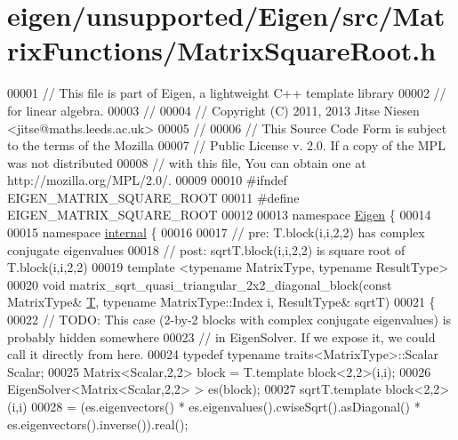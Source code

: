 \hypertarget{eigen_2unsupported_2_eigen_2src_2_matrix_functions_2_matrix_square_root_8h_source}{}\section{eigen/unsupported/\+Eigen/src/\+Matrix\+Functions/\+Matrix\+Square\+Root.h}
\label{eigen_2unsupported_2_eigen_2src_2_matrix_functions_2_matrix_square_root_8h_source}

\begin{DoxyCode}
00001 \textcolor{comment}{// This file is part of Eigen, a lightweight C++ template library}
00002 \textcolor{comment}{// for linear algebra.}
00003 \textcolor{comment}{//}
00004 \textcolor{comment}{// Copyright (C) 2011, 2013 Jitse Niesen <jitse@maths.leeds.ac.uk>}
00005 \textcolor{comment}{//}
00006 \textcolor{comment}{// This Source Code Form is subject to the terms of the Mozilla}
00007 \textcolor{comment}{// Public License v. 2.0. If a copy of the MPL was not distributed}
00008 \textcolor{comment}{// with this file, You can obtain one at http://mozilla.org/MPL/2.0/.}
00009 
00010 \textcolor{preprocessor}{#ifndef EIGEN\_MATRIX\_SQUARE\_ROOT}
00011 \textcolor{preprocessor}{#define EIGEN\_MATRIX\_SQUARE\_ROOT}
00012 
00013 \textcolor{keyword}{namespace }\hyperlink{namespace_eigen}{Eigen} \{ 
00014 
00015 \textcolor{keyword}{namespace }\hyperlink{namespaceinternal}{internal} \{
00016 
00017 \textcolor{comment}{// pre:  T.block(i,i,2,2) has complex conjugate eigenvalues}
00018 \textcolor{comment}{// post: sqrtT.block(i,i,2,2) is square root of T.block(i,i,2,2)}
00019 \textcolor{keyword}{template} <\textcolor{keyword}{typename} MatrixType, \textcolor{keyword}{typename} ResultType>
00020 \textcolor{keywordtype}{void} matrix\_sqrt\_quasi\_triangular\_2x2\_diagonal\_block(\textcolor{keyword}{const} MatrixType& \hyperlink{group___sparse_core___module_class_eigen_1_1_triplet}{T}, \textcolor{keyword}{typename} MatrixType::Index i, 
      ResultType& sqrtT)
00021 \{
00022   \textcolor{comment}{// TODO: This case (2-by-2 blocks with complex conjugate eigenvalues) is probably hidden somewhere}
00023   \textcolor{comment}{//       in EigenSolver. If we expose it, we could call it directly from here.}
00024   \textcolor{keyword}{typedef} \textcolor{keyword}{typename} traits<MatrixType>::Scalar Scalar;
00025   Matrix<Scalar,2,2> block = T.template block<2,2>(i,i);
00026   EigenSolver<Matrix<Scalar,2,2> > es(block);
00027   sqrtT.template block<2,2>(i,i)
00028     = (es.eigenvectors() * es.eigenvalues().cwiseSqrt().asDiagonal() * es.eigenvectors().inverse()).real();

\end{DoxyCode}
